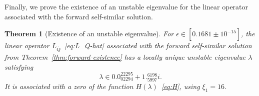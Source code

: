 \documentclass[11pt]{article}
\newtheorem{theorem}[definition]{Theorem}
\newcommand{\codenumber}[1]{#1}
\newcommand{\resultnumber}[1]{#1}
\begin{document}
Finally, we prove the existence of an unstable eigenvalue for the
linear operator associated with the forward self-similar solution.

\begin{theorem}[Existence of an unstable eigenvalue]\label{thm:unstable-eigenvalue}
  For \(\epsilon \in \codenumber{[0.1681 \pm 10^{-15}]}\), the linear
  operator \(L_{\hat{Q}}\)~\eqref{eq:L_Q-hat} associated with the
  forward self-similar solution from
  Theorem~\ref{thm:forward-existence} has a locally unique unstable
  eigenvalue \(\lambda\) satisfying
  \begin{equation*}
    \lambda \in \resultnumber{0.0_{02294}^{22295} + 1._{5997}^{6198} i}.
  \end{equation*}
  It is associated with a zero of the function
  \(H(\lambda)\)~\eqref{eq:H}, using
  \(\xi_{1} = \codenumber{16}\).
\end{theorem}
\end{document}
